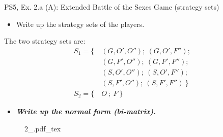 \begin{frame}{PS5, Ex. 2.a (A): Extended Battle of the Sexes Game (strategy sets)}
  \begin{multicols}{2}
    \begin{itemize}
      \item[(a)] Write up the strategy sets of the players.
    \end{itemize}
    The two strategy sets are:
    \begin{align*}
      S_1=\{\ &(G, O', O'');\ (G, O', F'');\\
              &(G, F', O'');\ (G, F', F'');\\
              &(S, O', O'');\ (S, O', F'');\\
              &(S, F', O'');\ (S, F', F'')\ \}\\
      S_2=\{\ &O\ ;\ F\ \}
    \end{align*}
    \begin{itemize}
      \item[(b)] \textbf{\textit{Write up the normal form (bi-matrix).}}
    \end{itemize}
    \vfill\null \columnbreak
    \begin{figure}[!h]
      \center
      \def\svgwidth{\columnwidth}
      {2_.pdf_tex}
    \end{figure}
    \vfill\null
  \end{multicols}
\end{frame}

